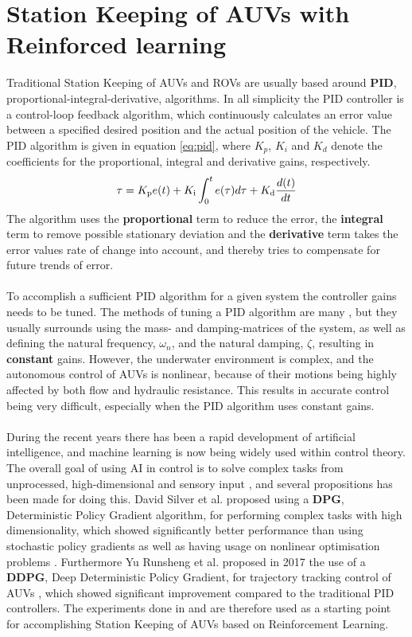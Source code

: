 \chapter{Station Keeping of AUVs with Reinforced learning} \label{chap:station-keeping}
Traditional Station Keeping of AUVs and ROVs are usually based around \textbf{PID}, proportional-integral-derivative, algorithms. In all simplicity the PID controller is a control-loop feedback algorithm, which continuously calculates an error value between a specified desired position and the actual position of the vehicle. The PID algorithm is given in equation \ref{eq:pid}, where $K_{p}$, $K_{i}$ and $K_{d}$ denote the coefficients for the proportional, integral and derivative gains, respectively. 
\begin{equation}
\centering
{\displaystyle \tau = K_{\text{p}}e(t)+K_{\text{i}}\int _{0}^{t}e(\tau )d\tau +K_{\text{d}}{\frac {d(t)}{dt}}}
\label{eq:pid}
\end{equation}
The algorithm uses the \textbf{proportional} term to reduce the error, the \textbf{integral} term to remove possible stationary deviation and the \textbf{derivative} term takes the error values rate of change into account, and thereby tries to compensate for future trends of error.\\\\
To accomplish a sufficient PID algorithm for a given system the controller gains needs to be tuned. The methods of tuning a PID algorithm are many \cite{Fossen}, but they usually surrounds using the mass- and damping-matrices of the system, as well as defining the natural frequency, $\omega_{n}$, and the natural damping, $\zeta$, resulting in \textbf{constant} gains. However, the underwater environment is complex, and the autonomous control of AUVs is nonlinear, because of their motions being highly affected by both flow and hydraulic resistance. This results in accurate control being very difficult, especially when the PID algorithm uses constant gains.\\\\
During the recent years there has been a rapid development of artificial intelligence, and machine learning is now being widely used within control theory. The overall goal of using AI in control is to solve complex tasks from unprocessed, high-dimensional and sensory input \cite{Lillicrap}, and several propositions has been made for doing this. David Silver et al. proposed using a \textbf{DPG}, Deterministic Policy Gradient algorithm, for performing complex tasks with high dimensionality, which showed significantly better performance than using stochastic policy gradients as well as having usage on nonlinear optimisation problems \cite{David}. Furthermore Yu Runsheng et al. proposed in 2017 the use of a \textbf{DDPG}, Deep Deterministic Policy Gradient, for trajectory tracking control of AUVs \cite{Yu}, which showed significant improvement compared to the traditional PID controllers. The experiments done in \cite{Yu} and \cite{David} are therefore used as a starting point for accomplishing Station Keeping of AUVs based on Reinforcement Learning.
